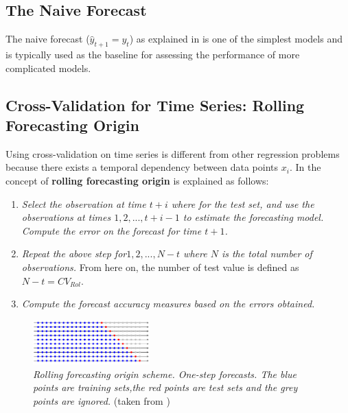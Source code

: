\subsection{The Naive Forecast}

The naive forecast ($\hat{y}_{t+1}=y_{t}$) as explained in \cite{makridakis2008forecasting} is one of the simplest models and is typically used as the baseline for assessing the performance of more complicated models.


\subsection{Cross-Validation for Time Series: Rolling Forecasting Origin}

Using cross-validation on time series is different from other regression problems because there exists a temporal dependency between data points $x_{i}$. In \cite{hyndman2006another} the concept of \textbf{rolling forecasting origin} is explained as follows:

\begin{enumerate}
	\item \textit{ Select the observation at time $t + i$ where for the test set, and use the observations at times $1, 2, . . . , t+i-1$ to estimate the forecasting model. Compute the error on the forecast for time $t + 1$.}
	\item \textit{ Repeat the above step for$1, 2, . . . , N-t$ where $N$ is the total number of observations.} From here on, the number of test value is defined as $N-t=CV_{Rol}$.
	\item \textit{ Compute the forecast accuracy measures based on the errors obtained.}
\end{enumerate}

\begin{figure}[htpb!] %
	\centering %
	\includegraphics[width=0.4\textwidth]{data/cv_time.png} %
	\caption{\textit{ Rolling forecasting origin scheme. One-step forecasts. The blue points are training sets,the red points are test sets and the grey points are ignored.} (taken from \cite{hyndman2006another} )} %
	\label{fig:cross validation} %
\end{figure}



